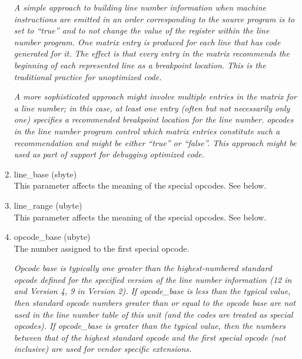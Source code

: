 \begin{enumerate}[1.]
\textit{A simple approach
to building line number information when machine instructions
are emitted in an order corresponding to the source program
is to set  
to ``true'' and to not change the
value of the  register 
within the line number program.
One matrix entry is produced for each line that has code
generated for it. The effect is that every entry in the
matrix recommends the beginning of each represented line as
a breakpoint location. This is the traditional practice for
unoptimized code.}

\textit{A more sophisticated approach might involve multiple entries in
the matrix for a line number; in this case, at least one entry
(often but not necessarily only one) specifies a recommended
breakpoint location for the line number. 
opcodes in the line number program control which matrix entries
constitute such a recommendation and 
 might
be either ``true'' or ``false''. This approach might be
used as part of support for debugging optimized code.}

\item line\_base (sbyte) \\
This parameter affects the meaning of the special opcodes. See below.

\item line\_range (ubyte) \\
This parameter affects the meaning of the special opcodes. See below.

\item opcode\_base (ubyte) \\
The 
number assigned to the first special opcode.

\textit{Opcode base is typically one greater than the highest-numbered
standard opcode defined for the specified version of the line
number information (12 in 
 and 
Version 4, 9 in
Version 2).  
If opcode\_base is less than the typical value,
then standard opcode numbers greater than or equal to the
opcode base are not used in the line number table of this unit
(and the codes are treated as special opcodes). If opcode\_base
is greater than the typical value, then the numbers between
that of the highest standard opcode and the first special
opcode (not inclusive) are used for vendor specific extensions.}


\end{enumerate}
